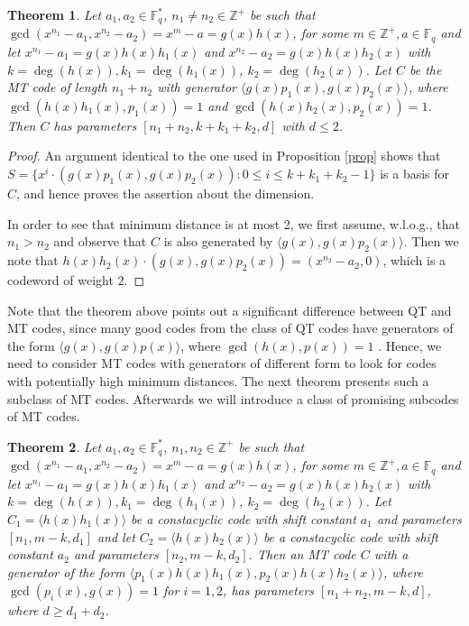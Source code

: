 \documentclass[preprint,12pt]{elsarticle}
\newtheorem{Theorem}{Theorem}[section]
\newcommand{\Fq}{\mathbb{F}_q}
\begin{document}
\begin{Theorem}\label{thm1}
Let $a_1,a_2\in \Fq^*$, $n_1\not = n_2\in \mathbb{Z}^{+}$ be such that 
$\gcd(x^{n_1}-a_1,x^{n_2}-a_2)=x^m-a=g(x)h(x)$,  for some $m \in \mathbb{Z}^{+}, a\in \Fq$ and let $x^{n_1}-a_1=g(x)h(x)h_1(x)$ and $x^{n_2}-a_2=g(x)h(x)h_2(x)$ with $k=\deg(h(x)), k_1=\deg(h_1(x))$, $k_2=\deg(h_2(x))$. Let $C$ be the MT code of length $n_1+n_2$ with generator $\langle g(x)p_1(x), g(x)p_2(x) \rangle$, where $\gcd(h(x)h_1(x),p_1(x))=1$ and $\gcd(h(x)h_2(x),p_2(x))=1$. Then $C$ has parameters $[n_1+n_2,k+k_1+k_2,d]$ with $d\leq 2$.
\end{Theorem}

\begin{proof}
An argument identical to the one used in Proposition \ref{prop} shows that $S=\{x^i\cdot (g(x)p_1(x), g(x)p_2(x)): 0\leq i\leq k+k_1+k_2-1\}$ is a basis for $C$, and hence proves the assertion about the dimension.

In order to see that minimum distance is at most 2,  we first assume, w.l.o.g., that $n_1 > n_2$ and observe that $C$ is also generated by $\langle g(x), g(x)p_2(x)\rangle$. Then we  note that $h(x)h_2(x)\cdot(g(x), g(x)p_2(x))=(x^{n_2}-a_2, 0)$, which is a codeword of weight $2$.
\end{proof}

Note that the theorem above points out a significant difference between QT and MT codes, since many good codes from the class of QT codes have generators of the form $\langle g(x), g(x)p(x) \rangle$, where $\gcd(h(x),p(x))=1$ \cite{qtmain}. Hence, we need to consider MT codes with generators of different form to look for codes with potentially high minimum distances. The next theorem presents such a subclass of MT codes. Afterwards we will introduce a class of promising subcodes of MT codes. 

\begin{Theorem}\label{mainthm}
Let $a_1,a_2\in \Fq^*$, $n_1,n_2\in \mathbb{Z}^{+}$ be such that $\gcd(x^{n_1}-a_1,x^{n_2}-a_2)=x^m-a=g(x)h(x)$,  for some $m \in \mathbb{Z}^{+}, a\in \Fq$ and let $x^{n_1}-a_1=g(x)h(x)h_1(x)$ and $x^{n_2}-a_2=g(x)h(x)h_2(x)$ with $k=\deg(h(x)), k_1=\deg(h_1(x))$, $k_2=\deg(h_2(x))$.
Let $C_1=\langle h(x)h_1(x)\rangle$ be a constacyclic code with shift constant $a_1$ and parameters $[n_1,m-k,d_1]$ and let $C_2=\langle h(x)h_2(x)\rangle$ be a constacyclic code with shift constant $a_2$ and parameters $[n_2,m-k,d_2]$. Then an MT code $C$ with a generator of the form $\langle p_1(x)h(x)h_1(x),p_2(x)h(x)h_2(x)\rangle$, where $\gcd(p_i(x),g(x))=1$ for $i=1,2$, has parameters $[n_1+n_2,m-k,d]$, where $d\geq d_1+d_2$.
\end{Theorem}
\end{document}
